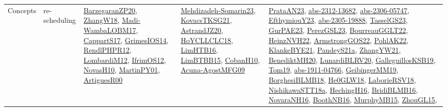 {\begin{longtable}{lp{3cm}>{\raggedright}p{6cm}>{\raggedright}p{6cm}p{8cm}}
Concepts & re-scheduling & \href{papers/BarzegaranZP20.pdf}{BarzegaranZP20}\cite{BarzegaranZP20}, \href{articles/ZhangW18.pdf}{ZhangW18}\cite{ZhangW18}, \href{papers/Madi-WambaLOBM17.pdf}{Madi-WambaLOBM17}\cite{Madi-WambaLOBM17}, \href{papers/CappartS17.pdf}{CappartS17}\cite{CappartS17}, \href{articles/GrimesIOS14.pdf}{GrimesIOS14}\cite{GrimesIOS14}, \href{papers/RendlPHPR12.pdf}{RendlPHPR12}\cite{RendlPHPR12}, \href{articles/LombardiM12.pdf}{LombardiM12}\cite{LombardiM12}, \href{papers/IfrimOS12.pdf}{IfrimOS12}\cite{IfrimOS12}, \href{articles/NovasH10.pdf}{NovasH10}\cite{NovasH10}, \href{articles/MartinPY01.pdf}{MartinPY01}\cite{MartinPY01}, \href{articles/ArtiguesR00.pdf}{ArtiguesR00}\cite{ArtiguesR00} & \href{papers/Mehdizadeh-Somarin23.pdf}{Mehdizadeh-Somarin23}\cite{Mehdizadeh-Somarin23}, \href{papers/KovacsTKSG21.pdf}{KovacsTKSG21}\cite{KovacsTKSG21}, \href{articles/AstrandJZ20.pdf}{AstrandJZ20}\cite{AstrandJZ20}, \href{papers/HoYCLLCLC18.pdf}{HoYCLLCLC18}\cite{HoYCLLCLC18}, \href{papers/LimHTB16.pdf}{LimHTB16}\cite{LimHTB16}, \href{papers/LimBTBB15.pdf}{LimBTBB15}\cite{LimBTBB15}, \href{papers/CobanH10.pdf}{CobanH10}\cite{CobanH10}, \href{papers/Acuna-AgostMFG09.pdf}{Acuna-AgostMFG09}\cite{Acuna-AgostMFG09} & \href{articles/PrataAN23.pdf}{PrataAN23}\cite{PrataAN23}, \href{articles/abs-2312-13682.pdf}{abs-2312-13682}\cite{abs-2312-13682}, \href{articles/abs-2306-05747.pdf}{abs-2306-05747}\cite{abs-2306-05747}, \href{papers/EfthymiouY23.pdf}{EfthymiouY23}\cite{EfthymiouY23}, \href{articles/abs-2305-19888.pdf}{abs-2305-19888}\cite{abs-2305-19888}, \href{papers/TasselGS23.pdf}{TasselGS23}\cite{TasselGS23}, \href{articles/GurPAE23.pdf}{GurPAE23}\cite{GurPAE23}, \href{papers/PerezGSL23.pdf}{PerezGSL23}\cite{PerezGSL23}, \href{articles/BourreauGGLT22.pdf}{BourreauGGLT22}\cite{BourreauGGLT22}, \href{articles/HeinzNVH22.pdf}{HeinzNVH22}\cite{HeinzNVH22}, \href{papers/ArmstrongGOS22.pdf}{ArmstrongGOS22}\cite{ArmstrongGOS22}, \href{articles/PohlAK22.pdf}{PohlAK22}\cite{PohlAK22}, \href{papers/KlankeBYE21.pdf}{KlankeBYE21}\cite{KlankeBYE21}, \href{articles/PandeyS21a.pdf}{PandeyS21a}\cite{PandeyS21a}, \href{articles/ZhangYW21.pdf}{ZhangYW21}\cite{ZhangYW21}, \href{articles/BenediktMH20.pdf}{BenediktMH20}\cite{BenediktMH20}, \href{articles/LunardiBLRV20.pdf}{LunardiBLRV20}\cite{LunardiBLRV20}, \href{papers/GalleguillosKSB19.pdf}{GalleguillosKSB19}\cite{GalleguillosKSB19}, \href{papers/Tom19.pdf}{Tom19}\cite{Tom19}, \href{articles/abs-1911-04766.pdf}{abs-1911-04766}\cite{abs-1911-04766}, \href{papers/GeibingerMM19.pdf}{GeibingerMM19}\cite{GeibingerMM19}, \href{articles/BorghesiBLMB18.pdf}{BorghesiBLMB18}\cite{BorghesiBLMB18}, \href{papers/He0GLW18.pdf}{He0GLW18}\cite{He0GLW18}, \href{articles/LaborieRSV18.pdf}{LaborieRSV18}\cite{LaborieRSV18}, \href{papers/NishikawaSTT18a.pdf}{NishikawaSTT18a}\cite{NishikawaSTT18a}, \href{papers/HechingH16.pdf}{HechingH16}\cite{HechingH16}, \href{articles/BridiBLMB16.pdf}{BridiBLMB16}\cite{BridiBLMB16}, \href{articles/NovaraNH16.pdf}{NovaraNH16}\cite{NovaraNH16}, \href{papers/BoothNB16.pdf}{BoothNB16}\cite{BoothNB16}, \href{papers/MurphyMB15.pdf}{MurphyMB15}\cite{MurphyMB15}, \href{papers/ZhouGL15.pdf}{ZhouGL15}\cite{ZhouGL15}, 
\end{longtable}}

